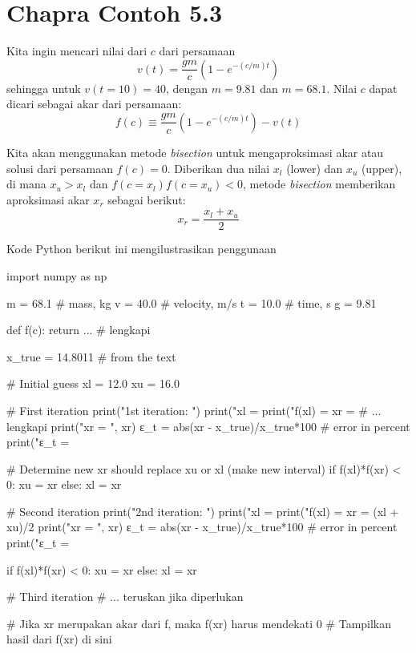 \section{Chapra Contoh 5.3}

Kita ingin mencari nilai dari $c$ dari persamaan
\begin{equation*}
v(t) = \frac{gm}{c}(1 - e^{-(c/m)t})
\end{equation*}
sehingga untuk $v(t=10) = 40$, dengan $m=9.81$ dan $m=68.1$.
Nilai $c$ dapat dicari sebagai akar dari persamaan:
\begin{equation*}
f(c) \equiv \frac{gm}{c}(1 - e^{-(c/m)t}) - v(t)
\end{equation*}

Kita akan menggunakan metode \textit{bisection} untuk mengaproksimasi akar atau solusi dari
persamaan $f(c) = 0$. Diberikan dua nilai $x_{l}$ (lower) dan $x_{u}$ (upper), di mana
$x_{u} > x_{l}$ dan $f(c=x_{l})f(c=x_{u}) < 0$, metode \textit{bisection} memberikan
aproksimasi akar $x_{r}$ sebagai berikut:
\begin{equation}
x_{r} = \frac{x_{l} + x_{u}}{2}
\end{equation}

Kode Python berikut ini mengilustrasikan penggunaan 
\begin{pythoncode}
import numpy as np

m = 68.1 # mass, kg
v = 40.0 # velocity, m/s
t = 10.0 # time, s
g = 9.81
    
def f(c):
    return ... # lengkapi
    
x_true = 14.8011 # from the text
    
# Initial guess
xl = 12.0
xu = 16.0
    
# First iteration
print("\n1st iteration: ")
print("xl = %
print("f(xl) = %
xr = # ... lengkapi
print("xr = ", xr)
ε_t = abs(xr - x_true)/x_true*100 # error in percent
print("ε_t = %

# Determine new xr should replace xu or xl (make new interval)
if f(xl)*f(xr) < 0:
    xu = xr
else:
    xl = xr
    
# Second iteration
print("\n2nd iteration: ")
print("xl = %
print("f(xl) = %
xr = (xl + xu)/2
print("xr = ", xr)
ε_t = abs(xr - x_true)/x_true*100 # error in percent
print("ε_t = %

if f(xl)*f(xr) < 0:
    xu = xr
else:
    xl = xr
    
# Third iteration
# ... teruskan jika diperlukan

# Jika xr merupakan akar dari f, maka f(xr) harus mendekati 0
# Tampilkan hasil dari f(xr) di sini
\end{pythoncode}

